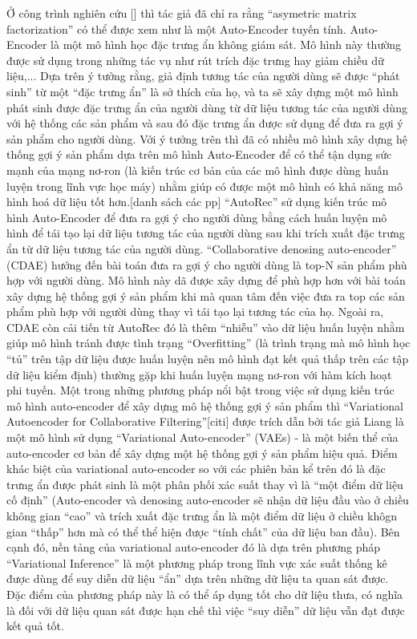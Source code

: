 Ở công trình nghiên cứu [] thì tác giả đã chỉ ra rằng ``asymetric matrix factorization'' có thể được xem như là một Auto-Encoder tuyến tính. Auto-Encoder là một mô hình học đặc trưng ẩn không giám sát. Mô hình này thường được sử dụng trong những tác vụ như rút trích đặc trưng hay giảm chiều dữ liệu,... Dựa trên ý tưởng rằng, giả định tương tác của người dùng sẽ được ``phát sinh'' từ một ``đặc trưng ẩn'' là sở thích của họ, và ta sẽ xây dựng một mô hình phát sinh được đặc trưng ẩn của người dùng từ dữ liệu tương tác của người dùng với hệ thống các sản phẩm và sau đó đặc trưng ẩn được sử dụng để đưa ra gợi ý sản phẩm cho người dùng. Với ý tưởng trên thì đã có nhiều mô hình xây dựng hệ thống gợi ý sản phẩm dựa trên mô hình Auto-Encoder để có thể tận dụng sức mạnh của mạng nơ-ron (là kiến trúc cơ bản của các mô hình được dùng huấn luyện trong lĩnh vực học máy) nhằm giúp có được một mô hình có khả năng mô hình hoá dữ liệu tốt hơn.[danh sách các pp]
``AutoRec'' sử dụng kiến trúc mô hình Auto-Encoder để đưa ra gợi ý cho người dùng bằng cách huấn luyện mô hình để tái tạo lại dữ liệu tương tác của người dùng sau khi trích xuất đặc trưng ẩn từ dữ liệu tương tác của người dùng. ``Collaborative denosing auto-encoder'' (CDAE) hướng đến bài toán đưa ra gợi ý cho người dùng là top-N sản phẩm phù hợp với người dùng. Mô hình này dã được xây dựng để phù hợp hơn với bài toán xây dựng hệ thống gợi ý sản phẩm khi mà quan tâm đến việc đưa ra top các sản phẩm phù hợp với người dùng thay vì tái tạo lại tương tác của họ. Ngoài ra, CDAE còn cải tiến từ AutoRec đó là thêm ``nhiễu'' vào dữ liệu huấn luyện nhằm giúp mô hình tránh được tình trạng ``Overfitting'' (là trình trạng mà mô hình học ``tủ'' trên tập dữ liệu được huấn luyện nên mô hình đạt kết quả thấp trên các tập dữ liệu kiểm định) thường gặp khi huấn luyện mạng nơ-ron với hàm kích hoạt phi tuyến.
Một trong những phương pháp nổi bật trong việc sử dụng kiến trúc mô hình auto-encoder để xây dựng mô hệ thống gợi ý sản phẩm thì ``Variational Autoencoder for Collaborative Filtering''[citi] được trích dẫn bởi tác giả Liang là một mô hình sử dụng ``Variational Auto-encoder'' (VAEs) - là một biến thể của auto-encoder cơ bản để xây dựng một hệ thống gợi ý sản phẩm hiệu quả.
Điểm khác biệt của variational auto-encoder so với các phiên bản kể trên đó là đặc trưng ẩn được phát sinh là một phân phối xác suất thay vì là ``một điểm dữ liệu cố định'' (Auto-encoder và denosing auto-encoder sẽ nhận dữ liệu đầu vào ở chiều không gian ``cao'' và trích xuất đặc trưng ẩn là một điểm dữ liệu ở chiều khôgn gian ``thấp'' hơn mà có thể thể hiện được ``tính chất'' của dữ liệu ban đầu). Bên cạnh đó, nền tảng của variational auto-encoder đó là dựa trên phương pháp ``Variational Inference'' là một phương pháp trong lĩnh vực xác suất thống kê được dùng để suy diễn dữ liệu ``ẩn'' dựa trên những dữ liệu ta quan sát được. Đặc điểm của phương pháp này là có thể áp dụng tốt cho dữ liệu thưa, có nghĩa là đối với dữ liệu quan sát được hạn chế thì việc ``suy diễn'' dữ liệu vẫn đạt được kết quả tốt.
